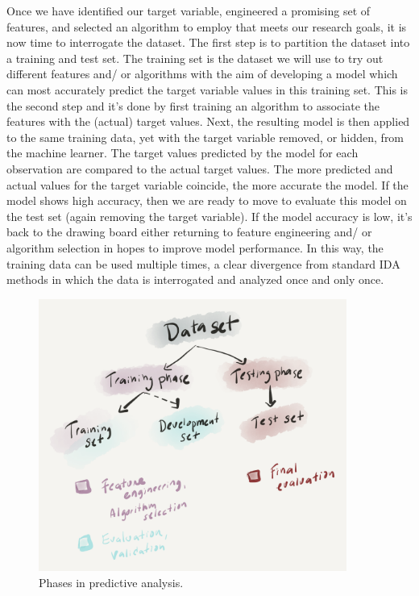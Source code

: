 \documentclass[
  letterpaper,
]{latex/krantz}
\begin{document}
Once we have identified our target variable, engineered a promising set
of features, and selected an algorithm to employ that meets our research
goals, it is now time to interrogate the dataset. The first step is to
partition the dataset into a training and test set. The training set is
the dataset we will use to try out different features and/ or algorithms
with the aim of developing a model which can most accurately predict the
target variable values in this training set. This is the second step and
it's done by first training an algorithm to associate the features with
the (actual) target values. Next, the resulting model is then applied to
the same training data, yet with the target variable removed, or hidden,
from the machine learner. The target values predicted by the model for
each observation are compared to the actual target values. The more
predicted and actual values for the target variable coincide, the more
accurate the model. If the model shows high accuracy, then we are ready
to move to evaluate this model on the test set (again removing the
target variable). If the model accuracy is low, it's back to the drawing
board either returning to feature engineering and/ or algorithm
selection in hopes to improve model performance. In this way, the
training data can be used multiple times, a clear divergence from
standard IDA methods in which the data is interrogated and analyzed once
and only once.

\begin{figure}

{\centering \includegraphics[width=0.9\textwidth,height=\textheight]{./figures/approaching-analysis/predictive-phases.png}

}

\caption{\label{fig-aa-predictive-phases}Phases in predictive analysis.}

\end{figure}
\end{document}
